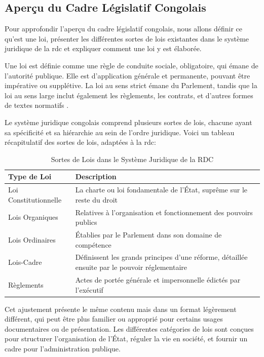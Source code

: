 \subsection{Aperçu du Cadre Législatif Congolais}

Pour approfondir l'aperçu du cadre législatif congolais, nous allons définir ce qu'est une loi, présenter les différentes sortes de lois existantes dans le système juridique de la \ac{rdc} et expliquer comment une loi y est élaborée.

Une loi est définie comme une règle de conduite sociale, obligatoire, qui émane de l'autorité publique. Elle est d'application générale et permanente, pouvant être impérative ou supplétive. La loi au sens strict émane du Parlement, tandis que la loi au sens large inclut également les règlements, les contrats, et d'autres formes de textes normatifs .

Le système juridique congolais comprend plusieurs sortes de lois, chacune ayant sa spécificité et sa hiérarchie au sein de l'ordre juridique. Voici un tableau récapitulatif des sortes de lois, adaptées à la \ac{rdc}:

\begin{table}[h]
\centering
\begin{tabular}{|l|p{10.5cm}|}
\hline
\textbf{Type de Loi} & \textbf{Description} \\ \hline
Loi Constitutionnelle & La charte ou loi fondamentale de l'État, suprême sur le reste du droit \\ \hline
Lois Organiques & Relatives à l'organisation et fonctionnement des pouvoirs publics \\ \hline
Lois Ordinaires & Établies par le Parlement dans son domaine de compétence \\ \hline
Lois-Cadre & Définissent les grands principes d'une réforme, détaillée ensuite par le pouvoir réglementaire \\ \hline
Règlements & Actes de portée générale et impersonnelle édictés par l'exécutif \\ \hline
\end{tabular}
\caption{Sortes de Lois dans le Système Juridique de la RDC}
\end{table}

Cet ajustement présente le même contenu mais dans un format légèrement différent, qui peut être plus familier ou approprié pour certains usages documentaires ou de présentation. Les différentes catégories de lois sont conçues pour structurer l'organisation de l'État, réguler la vie en société, et fournir un cadre pour l'administration publique.


